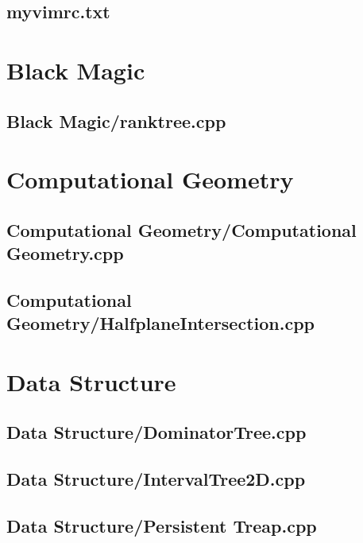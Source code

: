 \documentclass[a4paper,10pt,onecolumn,oneside]{article}
\begin{document}
\pagestyle{fancy}
\fancyfoot{}
\fancyhead[R]{\thepage}
\renewcommand{\headrulewidth}{0.4pt}
\renewcommand{\contentsname}{Contents} 

\scriptsize
\tableofcontents

\newpage

\subsection{myvimrc.txt}

\section{Black Magic}
\subsection{Black Magic/ranktree.cpp}

\section{Computational Geometry}
\subsection{Computational Geometry/Computational Geometry.cpp}

\subsection{Computational Geometry/HalfplaneIntersection.cpp}

\section{Data Structure}
\subsection{Data Structure/DominatorTree.cpp}

\subsection{Data Structure/IntervalTree2D.cpp}

\subsection{Data Structure/Persistent Treap.cpp}

\end{document}
